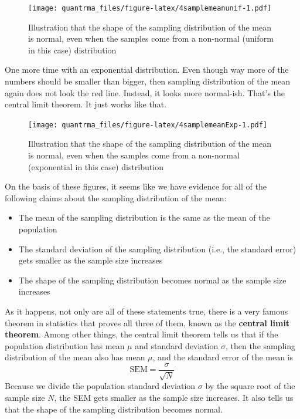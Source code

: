 \documentclass[
]{book}
\begin{document}
\begin{figure}
\centering
\texttt{[image: quantrma\_files/figure-latex/4samplemeanunif-1.pdf]}
\caption{\label{fig:4samplemeanunif}Illustration that the shape of the sampling distribution of the mean is normal, even when the samples come from a non-normal (uniform in this case) distribution}
\end{figure}

One more time with an exponential distribution. Even though way more of the numbers should be smaller than bigger, then sampling distribution of the mean again does not look the red line. Instead, it looks more normal-ish. That's the central limit theorem. It just works like that.

\begin{figure}
\centering
\texttt{[image: quantrma\_files/figure-latex/4samplemeanExp-1.pdf]}
\caption{\label{fig:4samplemeanExp}Illustration that the shape of the sampling distribution of the mean is normal, even when the samples come from a non-normal (exponential in this case) distribution}
\end{figure}

On the basis of these figures, it seems like we have evidence for all of the following claims about the sampling distribution of the mean:

\begin{itemize}
\item
  The mean of the sampling distribution is the same as the mean of the population
\item
  The standard deviation of the sampling distribution (i.e., the standard error) gets smaller as the sample size increases
\item
  The shape of the sampling distribution becomes normal as the sample size increases
\end{itemize}

As it happens, not only are all of these statements true, there is a very famous theorem in statistics that proves all three of them, known as the \textbf{central limit theorem}. Among other things, the central limit theorem tells us that if the population distribution has mean \(\mu\) and standard deviation \(\sigma\), then the sampling distribution of the mean also has mean \(\mu\), and the standard error of the mean is \[\mbox{SEM} = \frac{\sigma}{ \sqrt{N} }\] Because we divide the population standard deviation \(\sigma\) by the square root of the sample size \(N\), the SEM gets smaller as the sample size increases. It also tells us that the shape of the sampling distribution becomes normal.
\end{document}
